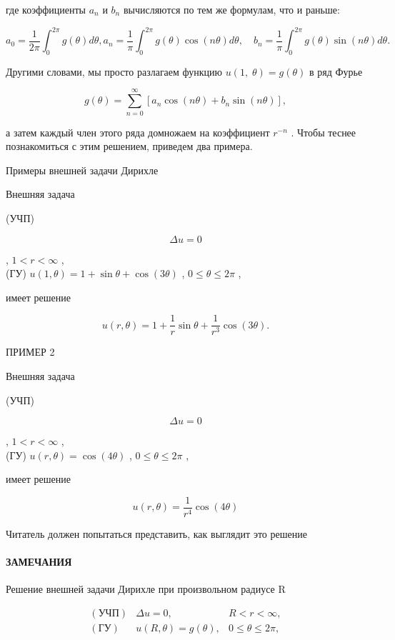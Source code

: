 \documentclass[
  ukrainian,
]{article}
\begin{document}
где коэффициенты \(a_n\) и \(b_n\) вычисляются по тем же формулам, что и
раньше:

\[
a_0 = \frac{1}{2\pi} \int_0^{2\pi} g(\theta) d\theta,
a_n = \frac{1}{\pi} \int_0^{2\pi} g(\theta) \cos(n\theta) d\theta, \quad b_n = \frac{1}{\pi} \int_0^{2\pi} g(\theta) \sin(n\theta) d\theta.
\]

Другими словами, мы просто разлагаем функцию
\(u\left(1,\;\theta\right)=g\left(\theta\right)\) в ряд Фурье

\[
g(\theta) = \sum_{n=0}^{\infty} [a_n \cos(n\theta) + b_n \sin(n\theta)],
\]

а затем каждый член этого ряда домножаем на коэффициент \(r^{-n}\) .
Чтобы теснее познакомиться с этим решением, приведем два примера.

Примеры внешней задачи Дирихле

Внешняя задача

(УЧП)

\[
\Delta u = 0
\]

, \(1 < r < \infty\) ,\\
(ГУ) \(u(1, \theta) = 1 + \sin \theta + \cos (3\theta)\) ,
\(0 \le \theta \le 2\pi\) ,

имеет решение

\[
u(r, \theta) = 1 + \frac{1}{r} \sin \theta + \frac{1}{r^3} \cos (3\theta).
\]

ПРИМЕР 2

Внешняя задача

(УЧП)

\[
\Delta u = 0
\]

, \(1 < r < \infty\) ,\\
(ГУ) \(u(r, \theta) = \cos(4\theta)\) , \(0 \le \theta \le 2\pi\) ,

имеет решение

\[
u(r, \theta) = \frac{1}{r^4} \cos(4\theta)
\]

Читатель должен попытаться представить, как выглядит это решение

\paragraph{ЗАМЕЧАНИЯ}\label{ux437ux430ux43cux435ux447ux430ux43dux438ux44f-9}

Решение внешней задачи Дирихле при произвольном радиусе R

\[
\begin{array}{lll} (\text{УЧП}) & \Delta u = 0, & R < r < \infty, \\ (\text{ГУ}) & u (R, \theta) = g (\theta), & 0 \leqslant \theta \leqslant 2\pi, \end{array}
\]
\end{document}
